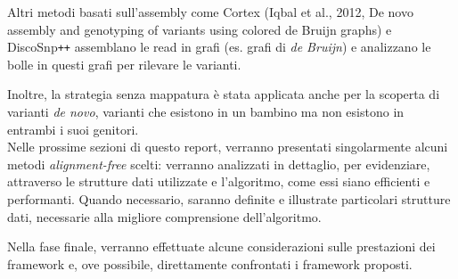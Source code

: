 \documentclass[../main.tex]{subfiles}
\begin{document}
Altri metodi basati sull'assembly come Cortex (Iqbal et al., 2012, De novo assembly and genotyping of variants using colored de Bruijn graphs) e DiscoSnp\texttt{++} \cite{peterlongo2017discosnp++} assemblano le read in grafi (es. grafi di \textit{de Bruijn}) e analizzano le bolle in questi grafi per rilevare le varianti. 

Inoltre, la strategia senza mappatura è stata applicata anche per la scoperta di varianti \textit{de novo}, varianti che esistono in un bambino ma non esistono in entrambi i suoi genitori.\\

\noindent
Nelle prossime sezioni di questo report, verranno presentati singolarmente alcuni metodi \textit{alignment-free} scelti: verranno analizzati in dettaglio, per evidenziare, attraverso le strutture dati utilizzate e l'algoritmo, come essi siano efficienti e performanti. Quando necessario, saranno definite e illustrate particolari strutture dati, necessarie alla migliore comprensione dell'algoritmo.

Nella fase finale, verranno effettuate alcune considerazioni sulle prestazioni dei framework e, ove possibile, direttamente confrontati i framework proposti.
\end{document}
